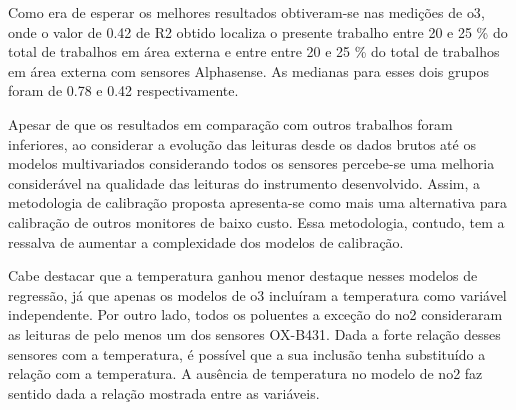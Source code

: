 Como era de esperar os melhores resultados obtiveram-se nas medições de \acrshort{o3}, onde o valor de 0.42 de R2 obtido localiza o presente trabalho entre 20 e 25 \% do total de trabalhos em área externa e entre entre 20 e 25 \% do total de trabalhos em área externa com sensores Alphasense. As medianas para esses dois grupos foram de 0.78 e 0.42 respectivamente.

Apesar de que os resultados em comparação com outros trabalhos foram inferiores, ao considerar a evolução das leituras desde os dados brutos até os modelos multivariados considerando todos os sensores percebe-se uma melhoria considerável na qualidade das leituras do instrumento desenvolvido. Assim, a metodologia de calibração proposta apresenta-se como mais uma alternativa para calibração de outros monitores de baixo custo. Essa metodologia, contudo, tem a ressalva de aumentar a complexidade dos modelos de calibração.

Cabe destacar que a temperatura ganhou menor destaque nesses modelos de regressão, já que apenas os modelos de \acrshort{o3} incluíram a temperatura como variável independente. Por outro lado, todos os poluentes a exceção do \acrshort{no2} consideraram as leituras de pelo menos um dos sensores OX-B431. Dada a forte relação desses sensores com a temperatura, é possível que a sua inclusão tenha substituído a relação com a temperatura. A ausência de temperatura no modelo de \acrshort{no2} faz sentido dada a relação mostrada entre as variáveis.